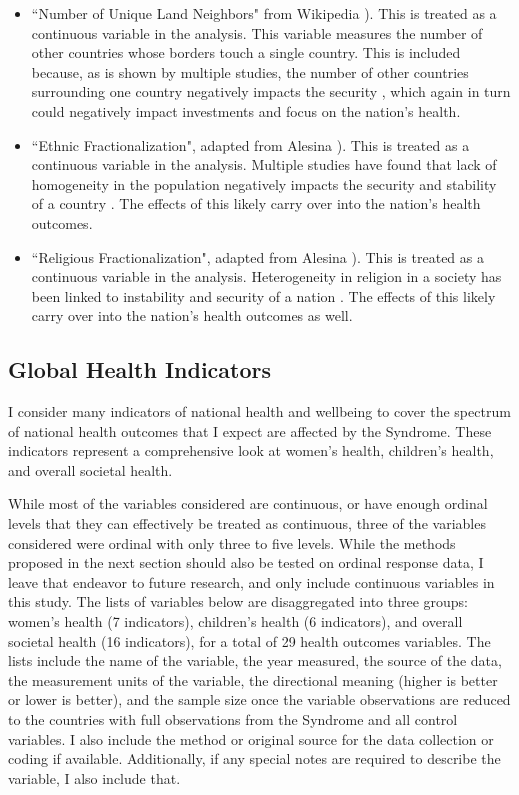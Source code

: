 \begin{itemize}
\item ``Number of Unique Land Neighbors" from Wikipedia \citep{Wiki2018}). This is treated as a continuous variable in the analysis. This variable measures the number of other countries whose borders touch a single country. This is included because, as is shown by multiple studies, the number of other countries surrounding one country negatively impacts the security \citep{HarveyMost, HarveyThomas}, which again in turn could negatively impact investments and focus on the nation's health.
\item ``Ethnic Fractionalization", adapted from Alesina \citep{Alesina}).  This is treated as a continuous variable in the analysis. Multiple studies have found that lack of homogeneity in the population negatively impacts the security and stability of a country \citep{Fearon, Blimes}. The effects of this likely carry over into the nation's health outcomes.
\item ``Religious Fractionalization", adapted from Alesina \citep{Alesina}).  This is treated as a continuous variable in the analysis. Heterogeneity in religion in a society has been linked to instability and security of a nation \citep{Fox, Juer}. The effects of this likely carry over into the nation's health outcomes as well.
\end{itemize}

\subsection{Global Health Indicators}

I consider many indicators of national health and wellbeing to cover the spectrum of national health outcomes that I expect are affected by the Syndrome. These indicators represent a comprehensive look at women's health, children's health, and overall societal health.

While most of the variables considered are continuous, or have enough ordinal levels that they can effectively be treated as continuous, three of the variables considered were ordinal with only three to five levels. While the methods proposed in the next section should also be tested on ordinal response data, I leave that endeavor to future research, and only include continuous variables in this study. The lists of variables below are disaggregated into three groups: women's health (7 indicators), children's health (6 indicators), and overall societal health (16 indicators), for a total of 29 health outcomes variables. The lists include the name of the variable, the year measured, the source of the data, the measurement units of the variable, the directional meaning (higher is better or lower is better), and the sample size once the variable observations are reduced to the countries with full observations from the Syndrome and all control variables. I also include the method or original source for the data collection or coding if available. Additionally, if any special notes are required to describe the variable, I also include that. 

